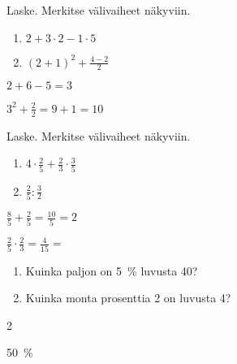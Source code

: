 

\begin{tehtava}
Laske. Merkitse välivaiheet näkyviin. 
\begin{enumerate}
\item $2+3\cdot 2-1\cdot5$
\item $(2+1)^2+\frac{4-2}{2}$
\end{enumerate}
\begin{vastaus}
\item $2+6-5=3$
\item $3^2+\frac{2}{2}=9+1=10$
\end{vastaus}
\end{tehtava}

\begin{tehtava}
Laske. Merkitse välivaiheet näkyviin. 
\begin{enumerate}
\item $4\cdot \frac{2}{5} + \frac{2}{3}\cdot \frac{3}{5}$
\item $\frac{2}{5} : \frac{3}{2}$
\end{enumerate}
\begin{vastaus}
\item $\frac{8}{5} + \frac{2}{5}=\frac{10}{5} = 2$
\item $\frac{2}{5} \cdot \frac{2}{3}=\frac{4}{15}=$
\end{vastaus}
\end{tehtava}

\begin{tehtava}
\begin{enumerate}
\item Kuinka paljon on 5~\% luvusta 40?
\item Kuinka monta prosenttia 2 on luvusta 4?
\end{enumerate}
\begin{vastaus}
\item 2
\item 50~\%
\end{vastaus}
\end{tehtava}

